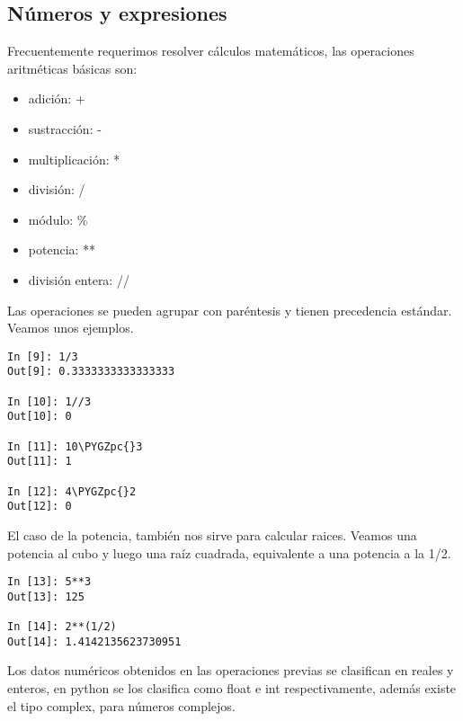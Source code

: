 \documentclass[a4paper,12pt,spanish]{sphinxmanual}
\def\PYGZpc{\char`\%}
\begin{document}
\subsection{Números y expresiones}
\label{Unidad01:numeros-y-expresiones}
Frecuentemente requerimos resolver cálculos matemáticos, las operaciones
aritméticas básicas son:
\begin{itemize}
\item {} 
adición: +

\item {} 
sustracción: -

\item {} 
multiplicación: *

\item {} 
división: /

\item {} 
módulo: \%

\item {} 
potencia: **

\item {} 
división entera: //

\end{itemize}

Las operaciones se pueden agrupar con paréntesis y tienen precedencia
estándar. Veamos unos ejemplos.

\begin{Verbatim}[commandchars=\\\{\}]
In [9]: 1/3
Out[9]: 0.3333333333333333

In [10]: 1//3
Out[10]: 0

In [11]: 10\PYGZpc{}3
Out[11]: 1

In [12]: 4\PYGZpc{}2
Out[12]: 0
\end{Verbatim}

El caso de la potencia, también nos sirve para calcular raices. Veamos
una potencia al cubo y luego una raíz cuadrada, equivalente a una
potencia a la 1/2.

\begin{Verbatim}[commandchars=\\\{\}]
In [13]: 5**3
Out[13]: 125

In [14]: 2**(1/2)
Out[14]: 1.4142135623730951
\end{Verbatim}

Los datos numéricos obtenidos en las operaciones previas se clasifican
en reales y enteros, en python se los clasifica como float e int
respectivamente, además existe el tipo complex, para números complejos.
\end{document}
